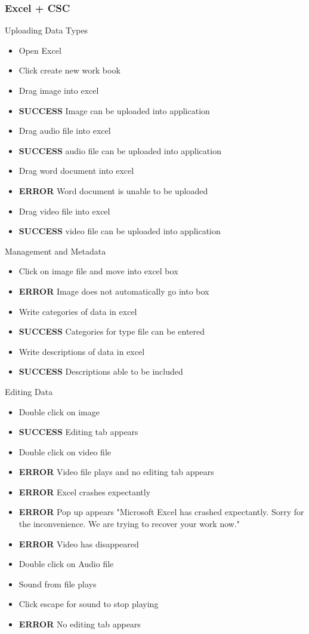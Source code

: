 \documentclass{article}
\begin{document}
\subsubsection{Excel + CSC}
Uploading Data Types
\begin{itemize}
\item Open Excel
\item Click create new work book
\item Drag image into excel
\item \textbf{SUCCESS} Image can be uploaded into application
\item Drag audio file into excel
\item \textbf{SUCCESS} audio file can be uploaded into application
\item Drag word document into excel
\item \textbf{ERROR} Word document is unable to be uploaded
\item Drag video file into excel
\item \textbf{SUCCESS} video file can be uploaded into application
\end{itemize}
Management and Metadata
\begin{itemize}
\item Click on image file and move into excel box
\item \textbf{ERROR} Image does not automatically go into box
\item Write categories of data in excel
\item \textbf{SUCCESS} Categories for type file can be entered
\item Write descriptions of data in excel
\item \textbf{SUCCESS} Descriptions able to be included
\end{itemize}
Editing Data
\begin{itemize}
\item Double click on image
\item \textbf{SUCCESS} Editing tab appears
\item Double click on video file
\item \textbf{ERROR} Video file plays and no editing tab appears
\item \textbf{ERROR} Excel crashes expectantly
\item \textbf{ERROR} Pop up appears "Microsoft Excel has crashed expectantly. Sorry for the inconvenience. We are trying to recover your work now."
\item \textbf{ERROR} Video has disappeared
\item Double click on Audio file
\item Sound from file plays
\item Click escape for sound to stop playing
\item \textbf{ERROR} No editing tab appears
\end{itemize}
\end{document}

